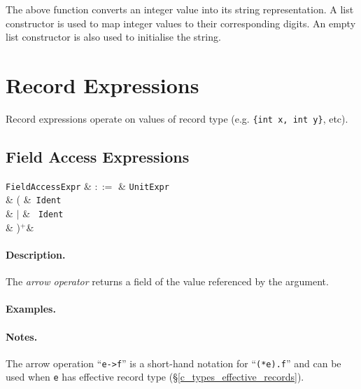 

The above function converts an integer value into its string representation.  A list constructor is used to map integer values to their corresponding digits.  An empty list constructor is also used to initialise the string.


\section{Record Expressions}
\label{c_expr_record}


Record expressions operate on values of record type (e.g. \lstinline|{int x, int y}|, etc).


\subsection{Field Access Expressions}
\label{c_expr_field_access}

\begin{syntax}
  \verb+FieldAccessExpr+ & $::=$ & \verb+UnitExpr+\\
   &  \big( &\ \verb+Ident+\ \\
   & $|$ & \token{->}\ \verb+Ident+\ \\
   & \big)$^+$&\\
\end{syntax}

\paragraph{Description.}

The {\em arrow operator} returns a field of the value referenced by the argument.

\paragraph{Examples.}

\paragraph{Notes.} The arrow operation ``\lstinline{e->f}'' is a short-hand notation for ``\lstinline{(*e).f}'' and can be used when \lstinline{e} has effective record type (\S\ref{c_types_effective_records}).


